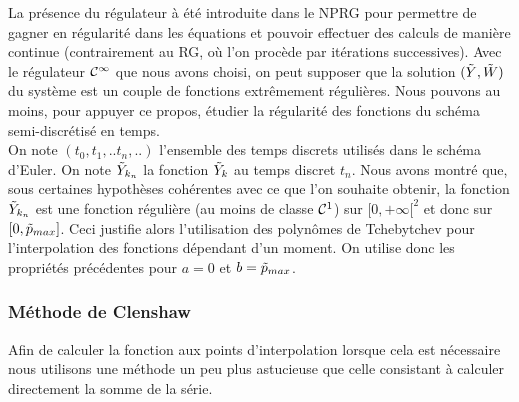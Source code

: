 \documentclass[10.5pt]{article}
\begin{document}
\begin{multicols*}{2}
{
}


La présence du régulateur à été introduite dans le NPRG pour permettre de gagner en régularité dans les équations et pouvoir effectuer des calculs de manière continue (contrairement au RG, où l'on procède par itérations successives). Avec le régulateur $\mathcal{C}^\infty$ que nous avons choisi, on peut supposer que la solution $(\tilde{Y}, \tilde{W})$ du système est un couple de fonctions extrêmement régulières. Nous pouvons au moins, pour appuyer ce propos, étudier la régularité des fonctions du schéma semi-discrétisé en temps. \\
\indent
On note $(t_0, t_1, .. t_n, ..)$ l'ensemble des temps discrets utilisés dans le schéma d'Euler. On note $\tilde{Y}_{k_n}$ la fonction $\tilde{Y}_k$ au temps discret $t_n$. Nous avons montré que, sous certaines hypothèses cohérentes avec ce que l'on souhaite obtenir, la fonction $\tilde{Y}_{k_n}$ est une fonction régulière (au moins de classe $\mathcal{C}^1$) sur $[0, +\infty[^2$ et donc sur $[0, \tilde{p}_{max}]$. Ceci justifie alors l'utilisation des polynômes de Tchebytchev pour l'interpolation des fonctions dépendant d'un moment. On utilise donc les propriétés précédentes pour $a=0$ et $b = \tilde{p}_{max}$. 




\subsubsection{Méthode de Clenshaw}


Afin de calculer la fonction aux points d'interpolation lorsque cela est nécessaire nous utilisons une méthode un peu plus astucieuse que celle consistant à calculer directement la somme de la série. \\


\end{multicols*}
\end{document}
